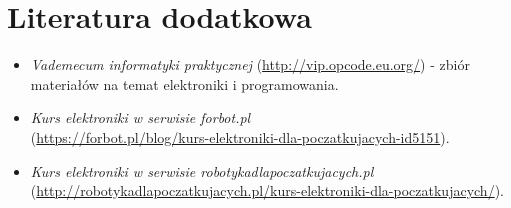 \section{Literatura dodatkowa}

\begin{itemize}
\item \emph{Vademecum informatyki praktycznej} (\url{http://vip.opcode.eu.org/}) - zbiór materiałów na temat elektroniki i programowania.
\item \emph{Kurs elektroniki w serwisie \emph{forbot.pl}}\\ (\url{https://forbot.pl/blog/kurs-elektroniki-dla-poczatkujacych-id5151}).
\item \emph{Kurs elektroniki w serwisie \emph{robotykadlapoczatkujacych.pl}}\\ (\url{http://robotykadlapoczatkujacych.pl/kurs-elektroniki-dla-poczatkujacych/}).
\end{itemize}
